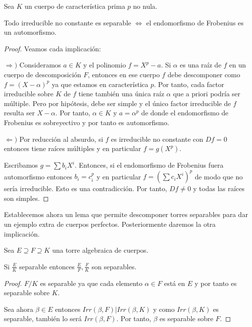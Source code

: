 \begin{theorem}
Sea $K$ un cuerpo de característica prima $p$ no nula. 

Todo irreducible no constante es separable $\iff$ el endomorfismo de Frobenius es un automorfismo. 
\end{theorem}
\begin{proof}
Veamos cada implicación:

$\Rightarrow)$ Consideramos $a \in K$  y el polinomio $f = X^p - a$. Si $\alpha$ es una raíz de $f$ en un cuerpo de descomposición $F$, entonces en ese cuerpo $f$ debe descomponer como $f = (X - \alpha)^p$ ya que estamos en característica $p$. Por tanto, cada factor irreducible sobre $K$ de $f$ tiene también una única raíz $\alpha$ que a priori podría ser múltiple. Pero por hipótesis, debe ser simple y el único factor irreducible de $f$ resulta ser $X - \alpha$. Por tanto, $\alpha \in K$ y $a = \alpha^p$ de donde el endomorfismo de Frobenius es sobreyectivo y por tanto es automorfismo. 

$\Leftarrow)$ Por reducción al absurdo, si $f$ es irreducible no constante con $Df = 0$ entonces tiene raíces múltiples y en particular $f = g(X^p)$. 

Escribamos $g = \sum b_iX^i$. Entonces, si el endomorfismo de Frobenius fuera automorfismo entonces $b_i = c_i^p$ y en particular $f = (\sum c_iX^i)^p$ de modo que no sería irreducible. Esto es una contradicción. Por tanto, $Df \neq 0$ y todas las raíces son simples. 
\end{proof}

Establecemos ahora un lema que permite descomponer torres separables para dar un ejemplo extra de cuerpos perfectos. Posteriormente daremos la otra implicación. 

\begin{proposition}
Sea $E \supseteq F \supseteq K$ una torre algebraica de cuerpos. 

Si $\frac{E}{K}$ separable entonces  $\frac{E}{F},\frac{F}{K}$ son separables. 
\end{proposition}
\begin{proof}
$F/K$ es separable ya que cada elemento $\alpha \in F$ está en $E$ y por tanto es separable sobre $K$. 

Sea ahora $\beta \in E$ entonces $Irr(\beta,F)|Irr(\beta,K)$ y como $Irr(\beta,K)$ es separable, también lo será $Irr(\beta,F)$. Por tanto, $\beta$ es separable sobre $F$. 
\end{proof}


